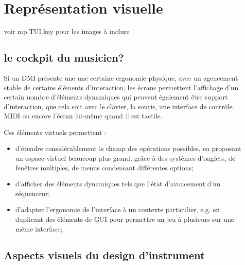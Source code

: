 %
\chapter{Représentation visuelle}
\label{ch:visual_representation}


voir mp.TUI.key pour les images à inclure

\section{le cockpit du musicien?}
Si un DMI présente une une certaine ergonomie physique, avec un agencement stable de certains éléments d'interaction, les écrans permettent l'affichage d'un certain nombre d'éléments dynamiques qui peuvent également être support d'interaction, que cela soit avec le clavier, la souris, une interface de contrôle MIDI ou encore l'écran lui-même quand il est tactile.

Ces éléments virtuels permettent :
\vspace{-1em}
\begin{itemize}[noitemsep]
	\item d'étendre considérablement le champ des opérations possibles, en proposant un espace virtuel beaucoup plus grand, grâce à des systèmes d'onglets, de fenêtres multiples, de menus condensant différentes options;
	\item d'afficher des éléments dynamiques tels que l'état d'avancement d'un séquenceur;
	\item d'adapter l'ergonomie de l'interface à un contexte particulier, e.g. en duplicant des éléments de GUI pour permettre un jeu à plusieurs sur une même interface;
\end{itemize}

\section{Aspects visuels du design d'instrument}

